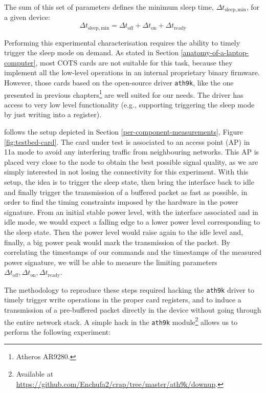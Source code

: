 \documentclass[twoside,nohyper]{tufte-book}
\theoremstyle{definition}
\theoremstyle{definition}
\theoremstyle{definition}
\theoremstyle{remark}
\begin{document}
The sum of this set of parameters defines the minimum sleep time,
\(\Delta t_\mathrm{sleep,min}\), for a given device:
%
\begin{equation}
 \Delta t_\mathrm{sleep,min} = \Delta t_\mathrm{off} + \Delta t_\mathrm{on} + \Delta t_\mathrm{ready}
 \label{eq:sleepmin}
\end{equation}
%

Performing this experimental characterisation requires the ability to
timely trigger the sleep mode on demand. As stated in Section
\ref{anatomy-of-a-laptop-computer}, most COTS cards are not suitable for
this task, because they implement all the low-level operations in an
internal proprietary binary firmware. However, those cards based on the
open-source driver \texttt{ath9k}, like the one presented in previous
chapters\footnote{Atheros AR9280.} are well suited for our needs. The
driver has access to very low level functionality (e.g., supporting
triggering the sleep mode by just writing into a register).

 follows the setup depicted in Section
\ref{per-component-measurements}, Figure \ref{fig:testbed-card}. The
card under test is associated to an access point (AP) in 11a mode to
avoid any interfering traffic from neighbouring networks. This AP is
placed very close to the node to obtain the best possible signal
quality, as we are simply interested in not losing the connectivity for
this experiment. With this setup, the idea is to trigger the sleep
state, then bring the interface back to idle and finally trigger the
transmission of a buffered packet as fast as possible, in order to find
the timing constraints imposed by the hardware in the power signature.
From an initial stable power level, with the interface associated and in
idle mode, we would expect a falling edge to a lower power level
corresponding to the sleep state. Then the power level would raise again
to the idle level and, finally, a big power peak would mark the
transmission of the packet. By correlating the timestamps of our
commands and the timestamps of the measured power signature, we will be
able to measure the limiting parameters
\(\Delta t_\mathrm{off}, \Delta t_\mathrm{on}, \Delta t_\mathrm{ready}\).

The methodology to reproduce these steps required hacking the
\texttt{ath9k} driver to timely trigger write operations in the proper
card registers, and to induce a transmission of a pre-buffered packet
directly in the device without going through the entire network stack. A
simple hack in the \texttt{ath9k} module\footnote{Available at
  \url{https://github.com/Enchufa2/crap/tree/master/ath9k/downup}.}
allows us to perform the following experiment:
\end{document}

